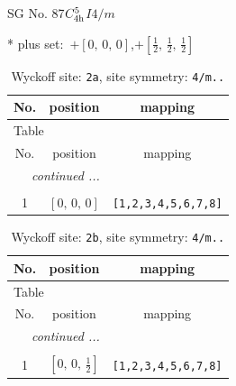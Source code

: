 \documentclass[fleqn,8pt]{jsarticle}
\begin{document}
\setcounter{MaxMatrixCols}{32}

\renewcommand{\tablename}{Table~}
\renewcommand{\figurename}{Figure~}
\begin{center}
\LARGE
SG No. 87\quad$C_{\rm 4h}^{5}$\quad$I4/m$\quad[ tetragonal ]
\end{center}
* plus set:\,\,\,$+\left[ 0,\, 0,\, 0 \right]$,\quad $+\left[ \frac{1}{2},\, \frac{1}{2},\, \frac{1}{2} \right]$
\renewcommand{\arraystretch}{1.2}
\begin{longtable}{ccc}
\caption{Wyckoff site: {\tt 2a}, site symmetry: {\tt 4/m..}}
 \\
 \hline \hline
No. & position & mapping \\ \hline \endfirsthead

\multicolumn{2}{l}{\tablename\ \thetable{}} \\
 \hline \hline
No. & position & mapping \\ \hline \endhead

 \hline \hline
\multicolumn{2}{r}{\footnotesize\it continued ...} \\ \endfoot

 \hline \hline
\multicolumn{2}{r}{} \\ \endlastfoot

1 & $\left[ 0,\, 0,\, 0 \right]$ & {\tt [1,2,3,4,5,6,7,8]} \\
\end{longtable}
\renewcommand{\arraystretch}{1.2}
\begin{longtable}{ccc}
\caption{Wyckoff site: {\tt 2b}, site symmetry: {\tt 4/m..}}
 \\
 \hline \hline
No. & position & mapping \\ \hline \endfirsthead

\multicolumn{2}{l}{\tablename\ \thetable{}} \\
 \hline \hline
No. & position & mapping \\ \hline \endhead

 \hline \hline
\multicolumn{2}{r}{\footnotesize\it continued ...} \\ \endfoot

 \hline \hline
\multicolumn{2}{r}{} \\ \endlastfoot

1 & $\left[ 0,\, 0,\, \frac{1}{2} \right]$ & {\tt [1,2,3,4,5,6,7,8]} \\
\end{longtable}
\renewcommand{\arraystretch}{1.2}
\end{document}
